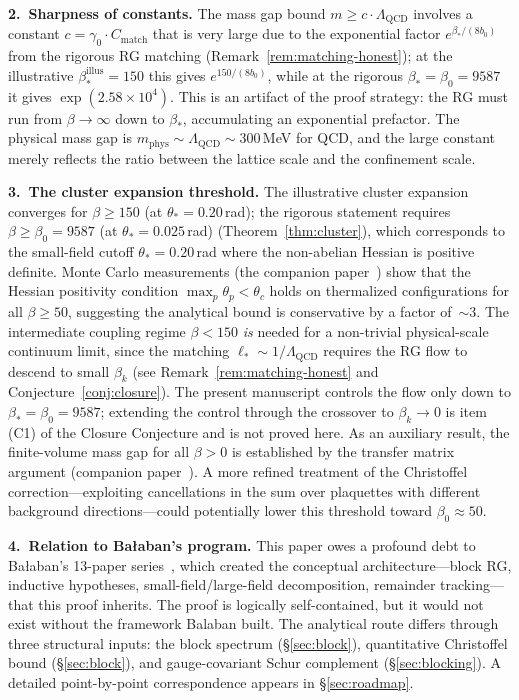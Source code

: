 \documentclass[11pt]{article}
\theoremstyle{definition}
\newcommand{\Lam}{\Lambda_{\mathrm{QCD}}}
\begin{document}
\medskip\noindent\textbf{2.~Sharpness of constants.}
The mass gap bound $m\ge c\cdot\Lam$ involves a constant
$c=\gamma_0\cdot C_{\mathrm{match}}$ that is very large due to the
exponential factor $e^{\beta_*/(8b_0)}$ from the rigorous RG matching (Remark~\ref{rem:matching-honest}); at the illustrative $\beta_*^{\mathrm{illus}}=150$ this gives $e^{150/(8b_0)}$, while at the rigorous $\beta_*=\beta_0=9587$ it gives $\exp(2.58\times 10^4)$.  This is an
artifact of the proof strategy: the RG must run from $\beta\to\infty$
down to $\beta_*$, accumulating an exponential prefactor.
The physical mass gap is
$m_{\mathrm{phys}}\sim\Lam\sim 300$\,MeV for QCD, and the large
constant merely reflects the ratio between the lattice scale and the
confinement scale.

\medskip\noindent\textbf{3.~The cluster expansion threshold.}
The illustrative cluster expansion converges for $\beta\ge 150$ (at $\theta_*=0.20$\,rad); the rigorous statement requires $\beta\ge\beta_0=9587$ (at $\theta_*=0.025$\,rad)
(Theorem~\ref{thm:cluster}), which corresponds to the small-field
cutoff $\theta_*=0.20$\,rad where the non-abelian Hessian is
positive definite.  Monte Carlo measurements
(the companion paper~\cite{companion}) show that the Hessian positivity
condition $\max_p\theta_p<\theta_c$ holds on thermalized
configurations for all $\beta\ge 50$, suggesting the analytical
bound is conservative by a factor of~${\sim}3$.
The intermediate coupling regime
$\beta<150$ \emph{is} needed for a non-trivial physical-scale continuum
limit, since the matching $\ell_*\sim 1/\Lam$ requires the RG flow
to descend to small $\beta_k$ (see Remark~\ref{rem:matching-honest}
and Conjecture~\ref{conj:closure}).  The present manuscript controls
the flow only down to $\beta_*=\beta_0=9587$; extending the control
through the crossover to $\beta_k\to 0$ is item (C1) of the Closure
Conjecture and is not proved here.  As an auxiliary result, the
finite-volume mass gap for all
$\beta>0$ is established by the transfer matrix argument
(companion paper~\cite{companion}).  A more refined treatment of the Christoffel
correction---exploiting cancellations in the sum over plaquettes
with different background directions---could potentially lower
this threshold toward $\beta_0\approx 50$.

\medskip\noindent\textbf{4.~Relation to Ba\l aban's program.}
This paper owes a profound debt to Ba\l aban's
13-paper series~\cite{BalabanI,BalabanII,BalabanIII,BalabanLF1,BalabanLF2},
which created the conceptual architecture---block RG, inductive
hypotheses, small-field/large-field decomposition, remainder
tracking---that this proof inherits.
The proof is logically self-contained, but it would not exist
without the framework Balaban built.
The analytical route differs through three structural inputs:
the block spectrum (\S\ref{sec:block}), quantitative
Christoffel bound (\S\ref{sec:block}), and gauge-covariant
Schur complement (\S\ref{sec:blocking}).
A detailed point-by-point correspondence appears in
\S\ref{sec:roadmap}.
\end{document}
